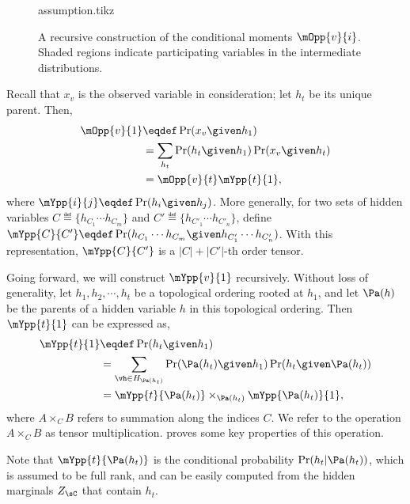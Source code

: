 \begin{figure}[t]
  \label{fig:message-proof}
  \centering
  {assumption.tikz}
  \caption{A recursive construction of the conditional moments $\mOpp{v}{i}$. Shaded regions indicate participating variables in the intermediate distributions.}
\end{figure}

Recall that $x_v$ is the observed variable in consideration; let $h_t$
be its unique parent. Then, 
\begin{align}
  \mOpp{v}{1} &\eqdef \Pr( x_v \given h_1 ) \nonumber \\
              &= \sum_{h_t}  \Pr( h_t \given h_1 ) \Pr( x_v \given h_t ) \nonumber\\
              &= \mOpp{v}{t} \mYpp{t}{1}, \label{eqn:expanding-O}
\end{align}
where $\mYpp{i}{j} \eqdef \Pr( h_i \given h_j )$. 
More generally, for two sets of hidden variables $C \eqdef \{h_{C_1}
\cdots h_{C_m} \}$ and $C' \eqdef \{h_{C'_1} \cdots h_{C'_n} \}$, 
define $\mYpp{C}{C'} \eqdef \Pr( h_{C_1} \cdots h_{C_m} \given h_{C'_1}
\cdots h_{C'_n} )$. 
With this representation, $\mYpp{C}{C'}$ is a $|C| + |C'|$-th order
tensor.
  
Going forward, we will construct $\mYpp{v}{1}$ recursively.
Without loss of generality, let $h_1, h_2, \cdots, h_t$ be a topological
  ordering rooted at $h_1$,
and let $\Pa(h)$ be the parents of a hidden variable $h$ in
  this topological ordering.
Then $\mYpp{t}{1}$ can be expressed as,
\begin{align*}
  \mYpp{t}{1} &\eqdef \Pr( h_t \given h_1 )  \\
  &= \sum_{\vh \in H_{\Pa(h_t)}} \Pr( \Pa(h_t) \given h_1 ) \Pr( h_t \given \Pa(h_t) ) \\
  &= \mYpp{t}{\Pa(h_t)} \times_{\Pa(h_t)} \mYpp{ \Pa(h_t) }{1},
\end{align*}
where $A \times_{C} B$ refers to summation along the indices $C$. We
refer to the operation $A \times_C B$ as tensor multiplication.
 proves some key properties of this
operation. 

Note that $\mYpp{t}{\Pa(h_t)}$ is the conditional probability $\Pr(h_t
 | \Pa(h_t))$, which is assumed to be full rank, and can be easily
 computed from the hidden marginals $Z_\sC$ that contain $h_t$. 

